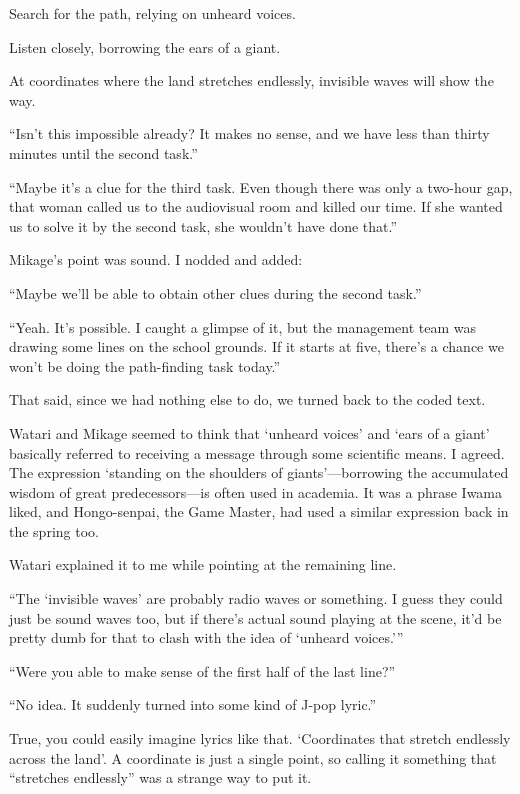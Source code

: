 \documentclass[
    a4paper,
    12pt,
    twoside,
    openany,
    UTF8,
    fontset=windows
]{ctexbook}
\begin{document}
\begin{center}
Search for the path, relying on unheard voices.

Listen closely, borrowing the ears of a giant.

At coordinates where the land stretches endlessly, invisible waves will show the way.
\end{center}

``Isn't this impossible already? It makes no sense, and we have less than thirty minutes until the second task.''

``Maybe it's a clue for the third task. Even though there was only a two-hour gap, that woman called us to the audiovisual room and killed our time. If she wanted us to solve it by the second task, she wouldn't have done that.''

Mikage's point was sound. I nodded and added:

``Maybe we'll be able to obtain other clues during the second task.''

``Yeah. It's possible. I caught a glimpse of it, but the management team was drawing some lines on the school grounds. If it starts at five, there's a chance we won't be doing the path-finding task today.''

That said, since we had nothing else to do, we turned back to the coded text.

Watari and Mikage seemed to think that `unheard voices' and `ears of a giant' basically referred to receiving a message through some scientific means. I agreed. The expression `standing on the shoulders of giants'---borrowing the accumulated wisdom of great predecessors---is often used in academia. It was a phrase Iwama liked, and Hongo-senpai, the Game Master, had used a similar expression back in the spring too.

Watari explained it to me while pointing at the remaining line.

``The `invisible waves' are probably radio waves or something. I guess they could just be sound waves too, but if there's actual sound playing at the scene, it'd be pretty dumb for that to clash with the idea of `unheard voices.'''

``Were you able to make sense of the first half of the last line?''

``No idea. It suddenly turned into some kind of J-pop lyric.''

True, you could easily imagine lyrics like that. `Coordinates that stretch endlessly across the land'. A coordinate is just a single point, so calling it something that ``stretches endlessly'' was a strange way to put it.
\end{document}
